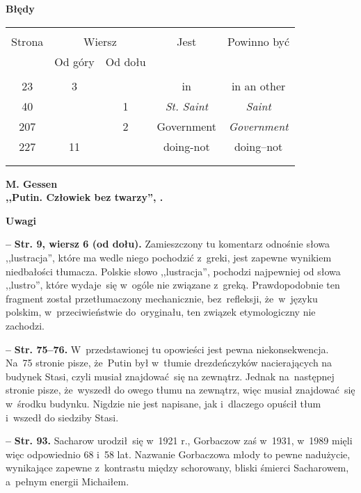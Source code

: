 \documentclass[a4paper,11pt]{article}
\newcommand{\spaceOne}{2em}
\newcommand{\tb}{\textbf}
\newcommand{\noi}{\noindent}
\newcommand{\start}{\noi \tb{--} {}}
\newcommand{\Center}[1]{\begin{center} #1 \end{center}}
\newcommand{\CenterTB}[1]{\Center{\tb{#1}}}
\newcommand{\Str}[1]{\tb{Str. #1.}}
\newcommand{\StrWd}[2]{\tb{Str. #1, wiersz #2 (od dołu).}}
\newcommand{\Work}[1]{ \begin{center} {\large \tb{#1}} \end{center} }
\begin{document}
\CenterTB{Błędy}

\begin{center}
  \begin{tabular}{|c|c|c|c|c|}
    \hline
    & \multicolumn{2}{c|}{} & & \\
    Strona & \multicolumn{2}{c|}{Wiersz}& Jest & Powinno być \\ \cline{2-3}
    & Od góry & Od dołu &  &  \\ \hline
    & & & & \\
    23 & 3 & & in & in an other \\
    40 & & 1 & \emph{St. Saint} & \emph{Saint} \\
    207 & & 2 & Government & \emph{Government} \\
    227 & 11 & & doing-not & doing--not \\
    & & & & \\
    & & & & \\ \hline
  \end{tabular}
\end{center}

\vspace{\spaceOne}



\Work{
  M. Gessen \\
  ,,Putin. Człowiek bez twarzy'', \cite{Ges12}.}


\CenterTB{Uwagi}

\start \StrWd{9}{6} Zamieszczony tu komentarz odnośnie słowa
,,lustracja'', które ma wedle niego pochodzić z~greki, jest zapewne
wynikiem niedbałości tłumacza. Polskie słowo ,,lustracja'', pochodzi
najpewniej od słowa ,,lustro'', które wydaje~się w~ogóle nie związane
z~greką. Prawdopodobnie ten fragment został przetłumaczony
mechanicznie, bez~refleksji, że~w~języku polskim, w~przeciwieństwie
do~oryginału, ten związek etymologiczny nie zachodzi.

\start \Str{75--76} W~przedstawionej tu opowieści jest pewna
niekonsekwencja. Na~75 stronie pisze, że~Putin był w~tłumie
drezdeńczyków nacierających na budynek Stasi, czyli musiał
znajdować~się na zewnątrz. Jednak na~następnej stronie pisze,
że~wyszedł do owego tłumu na zewnątrz, więc musiał znajdować~się
w~środku budynku. Nigdzie nie jest napisane, jak i~dlaczego opuścił
tłum i~wszedł do siedziby Stasi.

\start \Str{93} Sacharow urodził~się w~1921 r., Gorbaczow zaś w~1931,
w~1989 mięli więc odpowiednio 68 i~58 lat. Nazwanie Gorbaczowa młody
to pewne nadużycie, wynikające zapewne z~kontrastu między schorowany,
bliski śmierci Sacharowem, a~pełnym energii Michaiłem.
\end{document}
